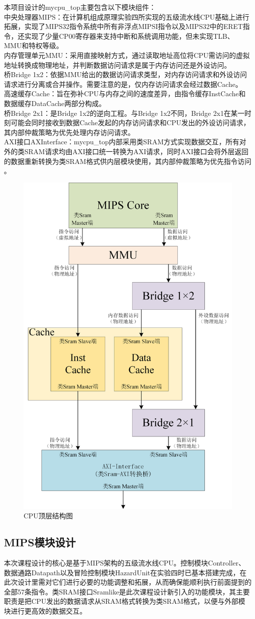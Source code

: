 本项目设计的mycpu\_top主要包含以下模块组件：\\
中央处理器MIPS：在计算机组成原理实验四所实现的五级流水线CPU基础上进行拓展，实现了MIPS32指令系统中所有非浮点MIPSI指令以及MIPS32中的ERET指令，还实现了少量CP00寄存器来支持中断和系统调用功能，但未实现TLB、MMU和特权等级。\\
内存管理单元MMU：采用直接映射方式，通过读取地址高位将CPU需访问的虚拟地址转换成物理地址，并判断数据访问请求是属于内存访问还是外设访问。\\
桥Bridge 1x2：依据MMU给出的数据访问请求类型，对内存访问请求和外设访问请求进行分离或合并操作。需要注意的是，仅内存访问请求会经过数据Cache。\\
高速缓存Cache：旨在弥补CPU与内存之间的速度差异，由指令缓存InstCache和数据缓存DataCache两部分构成。\\
桥Bridge 2x1：是Bridge 1x2的逆向工程。与Bridge 1x2不同，Bridge 2x1在某一时刻可能会同时接收到数据Cache发起的内存访问请求和CPU发出的外设访问请求，其内部仲裁策略为优先处理内存访问请求。\\
AXI接口AXInterface：mycpu\_top内部采用类SRAM方式实现数据交互，所有对外的类SRAM请求均由AXI接口统一转换为AXI请求，同时AXI接口会将外层返回的数据重新转换为类SRAM格式供内层模块使用，其内部仲裁策略为优先指令访问\\。
\begin{figure}[h]
	\centering
	\includegraphics[width=0.25\linewidth]{image/p15.png}
	\caption{CPU顶层结构图}
	\label{fig:enter-label}
\end{figure}
\subsection{MIPS模块设计\textcolor{black}{}}

本次课程设计的核心是基于MIPS架构的五级流水线CPU。控制模块Controller、数据通路Datapath以及冒险控制模块HazardUnit在实验四时已基本搭建完成，在此次设计里需对它们进行必要的功能调整和拓展，从而确保能顺利执行前面提到的全部57条指令。类SRAM接口Sramlike是此次课程设计新引入的功能模块，其主要职责是把CPU发出的数据请求从SRAM格式转换为类SRAM格式，以便与外部模块进行更高效的数据交互。

